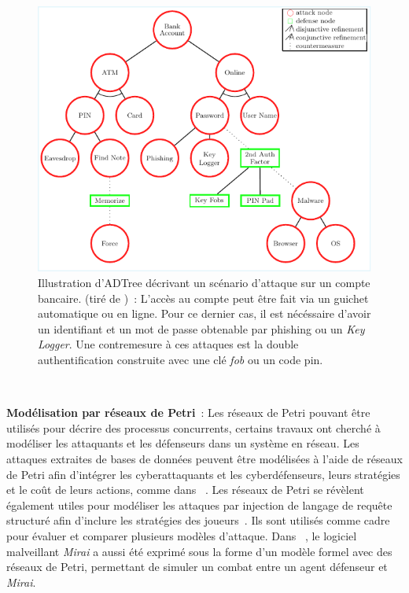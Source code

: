 \begin{figure}[h!]
  \centering
  \includegraphics[width=\linewidth]{figures/adt.pdf}
  \caption[Illustration d'ADTree d'un scénario d'attaque sur un compte bancaire.]{Illustration d'ADTree décrivant un scénario d'attaque sur un compte bancaire. (tiré de \cite{BKordy2010})~: L'accès au compte peut être fait via un guichet automatique ou en ligne. Pour ce dernier cas, il est nécéssaire d'avoir un identifiant et un mot de passe obtenable par phishing ou un \textit{Key Logger}. Une contremesure à ces attaques est la double authentification construite avec une clé \textit{fob} ou un code pin.}
  \label{fig:bank_attack_defense_tree}
\end{figure}

\

\noindent
\textbf{Modélisation par réseaux de Petri}~: \quad Les réseaux de Petri pouvant être utilisés pour décrire des processus concurrents, certains travaux ont cherché à modéliser les attaquants et les défenseurs dans un système en réseau.
Les attaques extraites de bases de données peuvent être modélisées à l'aide de réseaux de Petri afin d'intégrer les cyberattaquants et les cyberdéfenseurs, leurs stratégies et le coût de leurs actions, comme dans ~\cite{MPetty2022}. Les réseaux de Petri se révèlent également utiles pour modéliser les attaques par injection de langage de requête structuré afin d'inclure les stratégies des joueurs~\cite{JBland2020}.
Ils sont utilisés comme cadre pour évaluer et comparer plusieurs modèles d'attaque.
Dans ~\cite{SYamaguchi2020}, le logiciel malveillant \textit{Mirai} a aussi été exprimé sous la forme d'un modèle formel avec des réseaux de Petri, permettant de simuler un combat entre un agent défenseur et \textit{Mirai}.

